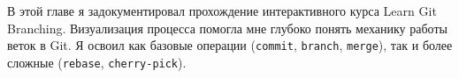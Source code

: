 В этой главе я задокументировал прохождение интерактивного курса Learn Git Branching.
Визуализация процесса помогла мне глубоко понять механику работы веток в Git.
Я освоил как базовые операции (\texttt{commit}, \texttt{branch}, \texttt{merge}), так и более сложные (\texttt{rebase}, \texttt{cherry-pick}).
